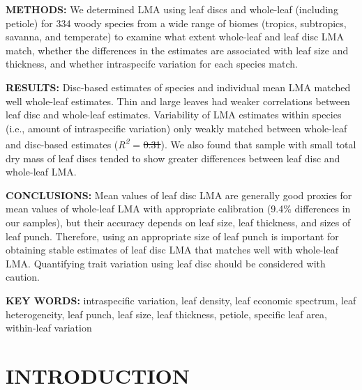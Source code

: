 \documentclass[
  12pt,
  a4paper,
,tablecaptionabove
]{scrartcl}
\providecommand{\DIFaddtex}[1]{{\protect\color{blue}\uwave{#1}}} %
\providecommand{\DIFdeltex}[1]{{\protect\color{red}\sout{#1}}}                      %
\providecommand{\DIFaddbegin}{} %
\providecommand{\DIFaddend}{} %
\providecommand{\DIFdelbegin}{} %
\providecommand{\DIFdelend}{} %
\providecommand{\DIFadd}[1]{\texorpdfstring{\DIFaddtex{#1}}{#1}} %
\providecommand{\DIFdel}[1]{\texorpdfstring{\DIFdeltex{#1}}{}} %
\newcommand{\DIFscaledelfig}{0.5}
\newlength{\DIFdelgraphicswidth} %
\newlength{\DIFdelgraphicsheight} %
\newcommand{\DIFaddincludegraphics}[2][]{{\color{blue}\fbox{\DIFOincludegraphics[#1]{#2}}}} %
\newcommand{\DIFdelincludegraphics}[2][]{%
\sbox{\DIFdelgraphicsbox}{\DIFOincludegraphics[#1]{#2}}%
\settoboxwidth{\DIFdelgraphicswidth}{\DIFdelgraphicsbox} %
\settoboxtotalheight{\DIFdelgraphicsheight}{\DIFdelgraphicsbox} %
\scalebox{\DIFscaledelfig}{%
\parbox[b]{\DIFdelgraphicswidth}{\usebox{\DIFdelgraphicsbox}\\[-\baselineskip] \rule{\DIFdelgraphicswidth}{0em}}\llap{\resizebox{\DIFdelgraphicswidth}{\DIFdelgraphicsheight}{%
\setlength{\unitlength}{\DIFdelgraphicswidth}%
\begin{picture}(1,1)%
\thicklines\linethickness{2pt} %
{\color[rgb]{1,0,0}\put(0,0){\framebox(1,1){}}}%
{\color[rgb]{1,0,0}\put(0,0){\line( 1,1){1}}}%
{\color[rgb]{1,0,0}\put(0,1){\line(1,-1){1}}}%
\end{picture}%
}\hspace*{3pt}}} %
} %
\DeclareRobustCommand{\DIFaddbegin}{\DIFOaddbegin \let\includegraphics\DIFaddincludegraphics} %
\DeclareRobustCommand{\DIFaddend}{\DIFOaddend \let\includegraphics\DIFOincludegraphics} %
\DeclareRobustCommand{\DIFdelbegin}{\DIFOdelbegin \let\includegraphics\DIFdelincludegraphics} %
\DeclareRobustCommand{\DIFdelend}{\DIFOaddend \let\includegraphics\DIFOincludegraphics} %
\begin{document}
\textbf{METHODS:} We determined LMA using leaf discs and whole-leaf
(including petiole) for 334 woody species from a wide range of biomes
(tropics, subtropics, savanna, and temperate) to examine what extent
whole-leaf and leaf disc LMA match, whether the differences in the
estimates are associated with leaf size and thickness, and whether
intraspecifc variation for each species match.

\textbf{RESULTS:} Disc-based estimates of species and individual mean
LMA matched well whole-leaf estimates. Thin and large leaves had weaker
correlations between leaf disc and whole-leaf estimates. Variability of
LMA estimates within species (i.e., amount of intraspecific variation)
only weakly matched between whole-leaf and disc-based estimates
(\emph{R\textsuperscript{2}} = \DIFdelbegin \DIFdel{0.31}\DIFdelend \DIFaddbegin \DIFadd{0.32}\DIFaddend ). We also found that sample with
small total dry mass of leaf discs tended to show greater differences
between leaf disc and whole-leaf LMA.

\textbf{CONCLUSIONS:} Mean values of leaf disc LMA are generally good
proxies for mean values of whole-leaf LMA with appropriate calibration
(9.4\% differences in our samples), but their accuracy depends on leaf
size, leaf thickness, and sizes of leaf punch. Therefore, using an
appropriate size of leaf punch is important for obtaining stable
estimates of leaf disc LMA that matches well with whole-leaf LMA.
Quantifying trait variation using leaf disc should be considered with
caution.

\textbf{KEY WORDS:} intraspecific variation, leaf density, leaf economic
spectrum, leaf heterogeneity, leaf punch, leaf size, leaf thickness,
petiole, specific leaf area, within-leaf variation

\hypertarget{introduction}{%
\section{INTRODUCTION}\label{introduction}}
\end{document}
